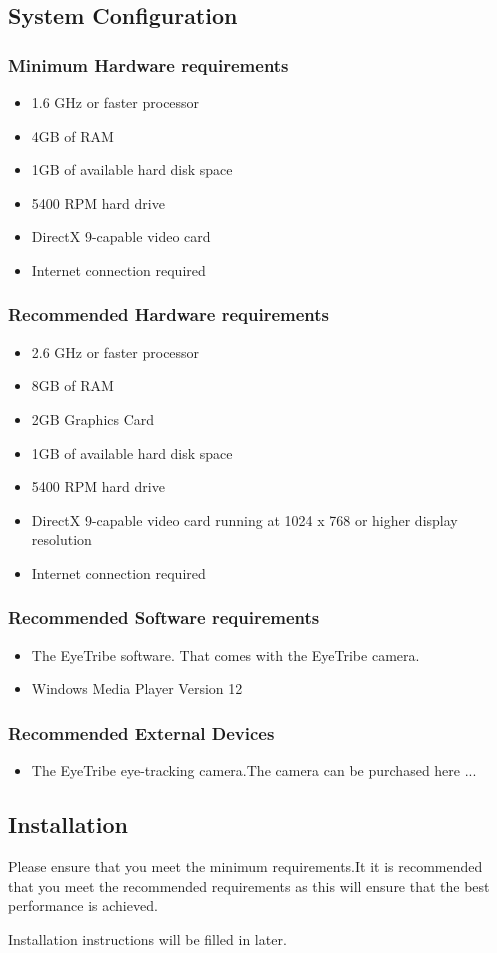 \subsection{System Configuration}
\subsubsection{Minimum Hardware requirements}
\begin{itemize}
\item 1.6 GHz or faster processor
\item 4GB of RAM
\item 1GB of available hard disk space
\item 5400 RPM hard drive
\item DirectX 9-capable video card
\item Internet connection required
\end{itemize}

\subsubsection{Recommended Hardware requirements}
\begin{itemize}
\item 2.6 GHz or faster processor
\item 8GB of RAM
\item 2GB Graphics Card
\item 1GB of available hard disk space
\item 5400 RPM hard drive
\item DirectX 9-capable video card running at 1024 x 768 or higher display resolution
\item Internet connection required
\end{itemize}

\subsubsection{Recommended Software requirements}
\begin{itemize}
\item The EyeTribe software. That comes with the EyeTribe camera.
\item Windows Media Player Version 12
\end{itemize}

\subsubsection{Recommended External Devices}
\begin{itemize}
\item The EyeTribe eye-tracking camera.The camera can be purchased here ...
\end{itemize}




\subsection{Installation }
Please ensure that you meet the minimum requirements.It it is recommended that you meet the recommended requirements as this will ensure that the best performance is achieved.

Installation instructions will be filled in later.